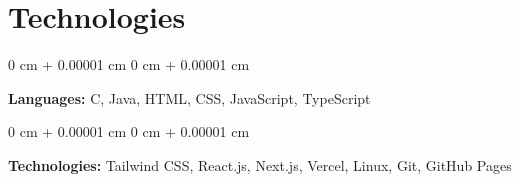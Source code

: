 \documentclass[10pt, letterpaper]{article}
\newenvironment{onecolentry}{
    \begin{adjustwidth}{
        0 cm + 0.00001 cm
    }{
        0 cm + 0.00001 cm
    }
}{
    \end{adjustwidth}
} %
\begin{document}
    
    \section{Technologies}

        \begin{onecolentry}
            \textbf{Languages:} C, Java, HTML, CSS, JavaScript, TypeScript
        \end{onecolentry}

        \vspace{0.2 cm}

        \begin{onecolentry}
            \textbf{Technologies:} Tailwind CSS, React.js, Next.js, Vercel, Linux, Git, GitHub Pages
        \end{onecolentry}


    
\end{document}
